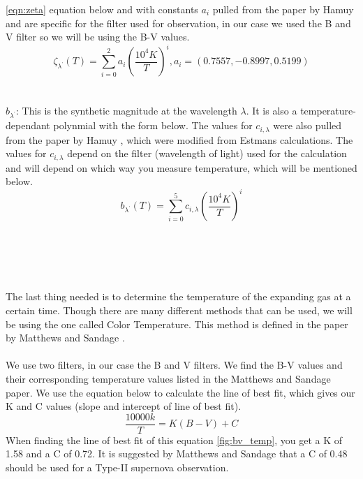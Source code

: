 \ref{eqn:zeta} equation below and with constants $a_i$ pulled from the paper by Hamuy \cite{hamuy_distance_2001}
and are specific for the filter used for observation, in our case we used the B and V filter so we will be using the B-V values.
\begin{equation}\label{eqn:zeta}
    \zeta_{\lambda^{\textrm{'}}}(T) = \sum_{i=0}^{2}a_i(\frac{10^4K}{T})^i
    ,a_i = (0.7557, -0.8997, 0.5199)
\end{equation}
\\
\\
$b_{\lambda^{\textrm{'}}}$: This is the synthetic magnitude at the wavelength $\lambda$. It is also a 
temperature-dependant polynmial with the form below. The values for $c_{i,\lambda}$ were also pulled from the paper
by Hamuy \cite{hamuy_distance_2001}, which were modified from Estmans \cite{eastman_atmospheres_1996} calculations.
The values for $c_{i,\lambda}$ depend on the filter (wavelength of light) used for the calculation and will depend on
which way you measure temperature, which will be mentioned below.
\begin{equation}\label{eqn:synth_mag}
    b_{\lambda^{\textrm{'}}}(T) = \sum_{i=0}^{5}c_{i,\lambda}(\frac{10^4K}{T})^i
\end{equation}
\\
\\
\\
\\
\\
The last thing needed is to determine the temperature of the expanding gas at a certain time. Though there are many different methods
that can be used, we will be using the one called Color Temperature. This method is defined in the paper by Matthews and Sandage \cite{matthews_optical_1963}.
\\
\\
We use two filters, in our case the B and V filters. We find the B-V values and their corresponding temperature values listed in the 
Matthews and Sandage \cite{matthews_optical_1963} paper. We use the equation below to calculate the line of best fit, which gives 
our K and C values (slope and intercept of line of best fit).
\begin{equation}\label{eqn:kandc}
    \frac{10000k}{T} = K(B-V)+C
\end{equation}
When finding the line of best fit of this equation \ref{fig:bv_temp}, you get a K of 1.58 and a C of 0.72. 
It is suggested by Matthews and Sandage \cite{matthews_optical_1963}
that a C of 0.48 should be used for a Type-II supernova observation.
